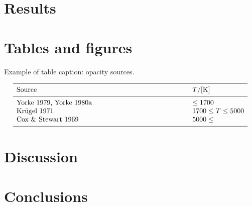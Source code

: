 \documentclass[a4paper,10pt]{article}
\begin{document}
\section{Results}

\newpage
\section{Tables and figures}




\begin{table}[htb]
      \caption[]{Example of table caption: opacity sources.}
         \label{KapSou}
     $$ 
         \begin{array}{p{0.7\linewidth}l}
            \hline
            \noalign{\smallskip}
            Source      &  T / {[\mathrm{K}]} \\
            \noalign{\smallskip}
            \hline
            \noalign{\smallskip}
            Yorke 1979, Yorke 1980a & \leq 1700           \\
            Kr\"ugel 1971           & 1700 \leq T \leq 5000 \\
            Cox \& Stewart 1969     & 5000 \leq             \\
            \noalign{\smallskip}
            \hline
         \end{array}
     $$ 
\end{table}

\section{Discussion}

\section{Conclusions}





\end{document}
